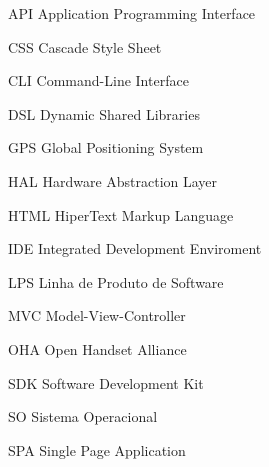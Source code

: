 \begin{siglas}
  
  \item[API] Application Programming Interface
  \item[CSS] Cascade Style Sheet
  \item[CLI] Command-Line Interface
  \item[DSL] Dynamic Shared Libraries
  \item[GPS] Global Positioning System
  \item[HAL] Hardware Abstraction Layer
  \item[HTML] HiperText Markup Language
  \item[IDE] Integrated Development Enviroment
  \item[LPS] Linha de Produto de Software
  \item[MVC] Model-View-Controller
  \item[OHA] Open Handset Alliance
  \item[SDK] Software Development Kit
  \item[SO] Sistema Operacional
  \item[SPA] Single Page Application
    
\end{siglas}
